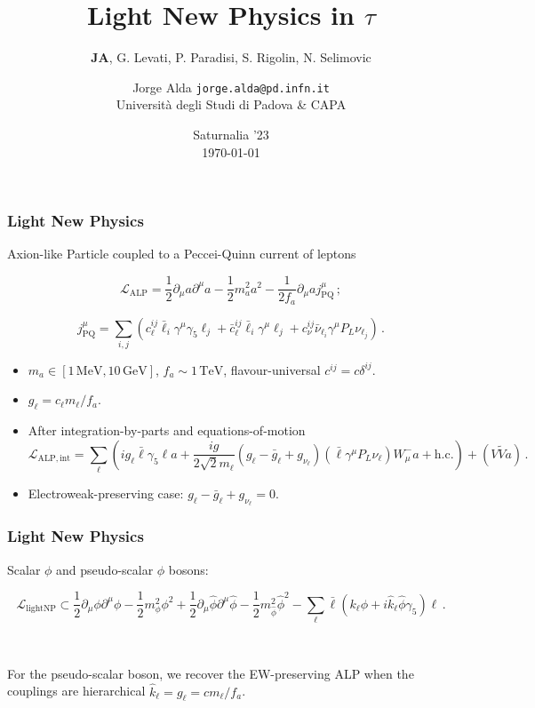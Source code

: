 \documentclass[mathserif, 10pt, aspectratio=169]{beamer}
\title{Light New Physics in $\tau$}
\subtitle{{\bf JA}, G. Levati, P. Paradisi, S. Rigolin, N. Selimovic}
\author[Jorge Alda]{Jorge Alda \hspace{4em} \texttt{jorge.alda@pd.infn.it} \\
Università degli Studi di Padova \& CAPA}
\date{Saturnalia '23 \\ \today}
\begin{document}
\begin{frame}

\titlepage

\end{frame}

\begin{frame}\frametitle{Light New Physics}
    Axion-like Particle coupled to a Peccei-Quinn current of leptons

    $$\mathcal{L}_\mathrm{ALP} = \frac{1}{2}\partial_\mu a \partial^\mu a - \frac{1}{2} m_a^2 a^2 - \frac{1}{2 f_a}\partial_\mu a j^\mu_\mathrm{PQ}\,;$$

    $$j^\mu_\mathrm{PQ} = \sum_{i,j} \left( c_\ell^{ij} \bar{\ell}_i\gamma^\mu \gamma_5 \ell_j + \bar{c}_\ell^{ij} \bar{\ell}_i\gamma^\mu  \ell_j  + c_\nu^{ij} \bar{\nu}_{\ell_i} \gamma^\mu P_L \nu_{\ell_j} \right)\,. $$

    \begin{itemize}
        \item $m_a \in [1\,\mathrm{MeV}, 10\,\mathrm{GeV}]$, $f_a \sim 1\,\mathrm{TeV}$, flavour-universal $c^{ij} = c \delta^{ij}$.
        
        \item $g_\ell = c_\ell m_\ell/f_a$.
        
        \item After integration-by-parts and equations-of-motion
        $$\mathcal{L}_\mathrm{ALP, int} = \sum_\ell \left(i g_\ell \bar{\ell}\gamma_5\ell a + \frac{ig}{2 \sqrt{2} m_\ell} (g_\ell - \bar{g}_\ell + g_{\nu_\ell}) (\bar{\ell}\gamma^\mu P_L \nu_\ell) W^-_\mu a + \mathrm{h.c.} \right) + (V\tilde{V}a)\,.$$

        \item Electroweak-preserving case: $g_\ell - \bar{g}_\ell + g_{\nu_\ell}=0$.
    \end{itemize}
\end{frame}

\begin{frame}\frametitle{Light New Physics}

    Scalar $\phi$ and pseudo-scalar $\hat{\phi}$ bosons:

    $$\mathcal{L}_\mathrm{light NP} \subset \frac{1}{2}\partial_\mu \phi \partial^\mu \phi - \frac{1}{2} m_\phi^2 \phi^2 + \frac{1}{2}\partial_\mu \hat{\phi} \partial^\mu \hat{\phi} - \frac{1}{2} m_{\hat{\phi}}^2 \hat{\phi}^2 - \sum_\ell \bar{\ell}(k_\ell \phi + i \hat{k}_\ell \hat{\phi}\gamma_5) \ell\,.$$

    ~
    
    For the pseudo-scalar boson, we recover the EW-preserving ALP when the couplings are hierarchical $\hat{k}_\ell = g_\ell = c m_\ell/f_a$.
\end{frame}
\end{document}
